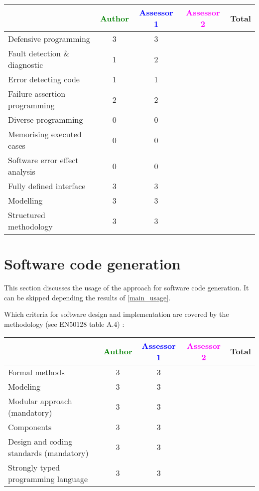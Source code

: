 \begin{tabular}{|l | c | c | c | c|}
\hline
& \textcolor{green}{Author} & \textcolor{blue}{Assessor 1} & \textcolor{magenta}{Assessor 2} & Total \\
\hline
Defensive programming  & 3 & 3 & &  \\
\hline 
Fault detection \& diagnostic  & 1 & 2 & &  \\
\hline
Error detecting code  & 1 & 1 & &  \\
\hline
Failure assertion programming & 2  & 2 & &  \\
\hline
Diverse programming & 0 & 0 & &  \\
\hline
Memorising executed cases & 0 & 0 & &  \\
\hline
Software error effect analysis & 0 & 0 & &  \\
\hline
Fully defined interface & 3 & 3 & &  \\
\hline
Modelling  & 3 & 3 & &  \\
\hline
Structured methodology & 3 & 3  & & \\
\hline
\end{tabular}

\section{Software code generation}
This section discusses the usage of the approach for software code generation.
It can be skipped depending the results of \ref{main_usage}.

Which criteria for software design and implementation are covered by the methodology
(see EN50128 table A.4) :

\begin{tabular}{|l | c | c | c | c|}
\hline
& \textcolor{green}{Author} & \textcolor{blue}{Assessor 1} & \textcolor{magenta}{Assessor 2} & Total \\
\hline
Formal methods  & 3 & 3 & &  \\
\hline 
Modeling  & 3 & 3 & &  \\
\hline
Modular approach (mandatory) & 3 & 3 & &  \\
\hline
Components & 3 & 3 & &  \\
\hline
Design and coding standards (mandatory) & 3 & 3 & &  \\
\hline
Strongly typed programming language & 3 & 3 & &  \\
\hline

\end{tabular}



